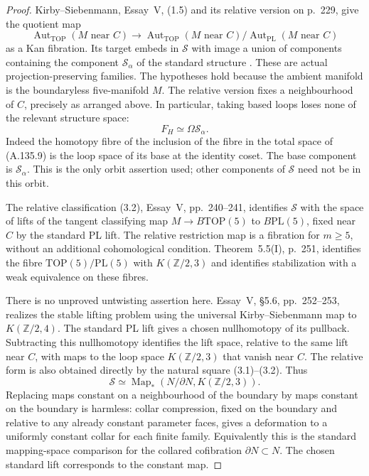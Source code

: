 \begin{proof}
Kirby--Siebenmann, Essay~V, (1.5) and its relative version on p.~229,
give the quotient map
\[
 \operatorname{Aut}_{\mathrm{TOP}}(M\text{ near }C)
 \longrightarrow
 \operatorname{Aut}_{\mathrm{TOP}}(M\text{ near }C)
 /\operatorname{Aut}_{\mathrm{PL}}(M\text{ near }C)
                                                        \tag{A.135.9}
\]
as a Kan fibration. Its target embeds in $\mathcal S$ with image a union
of components containing the component $\mathcal S_\alpha$ of the
standard structure \cite{KirbySiebenmann1977}. These are actual
projection-preserving families. The hypotheses hold because the
ambient manifold is the boundaryless five-manifold $M$. The relative
version fixes a neighbourhood of $C$, precisely as arranged above.
In particular, taking based loops loses none of the relevant structure
space:
\[
 F_H\simeq\Omega\mathcal S_\alpha.                       \tag{A.135.10}
\]
Indeed the homotopy fibre of the inclusion of the fibre in the total
space of (A.135.9) is the loop space of its base at the identity coset.
The base component is $\mathcal S_\alpha$. This is the only orbit
assertion used; other components of $\mathcal S$ need not be in this
orbit.

The relative classification (3.2), Essay~V, pp.~240--241, identifies
$\mathcal S$ with the space of lifts of the tangent classifying map
$M\to B\mathrm{TOP}(5)$ to $B\mathrm{PL}(5)$, fixed near $C$ by the
standard PL lift. The relative restriction map is a fibration for
$m\ge5$, without an additional cohomological condition. Theorem~5.5(I),
p.~251, identifies the fibre $\mathrm{TOP}(5)/\mathrm{PL}(5)$ with
$K(\mathbb Z/2,3)$ and identifies stabilization with a weak equivalence
on these fibres.

There is no unproved untwisting assertion here. Essay~V, \S5.6,
pp.~252--253, realizes the stable lifting problem using the universal
Kirby--Siebenmann map to $K(\mathbb Z/2,4)$. The standard PL lift gives
a chosen nullhomotopy of its pullback. Subtracting this nullhomotopy
identifies the lift space, relative to the same lift near $C$, with
maps to the loop space $K(\mathbb Z/2,3)$ that vanish near $C$.
The relative form is also obtained directly by the natural square
(3.1)--(3.2). Thus
\[
 \mathcal S\simeq
 \operatorname{Map}_*(N/\partial N,K(\mathbb Z/2,3)).      \tag{A.135.11}
\]
Replacing maps constant on a neighbourhood of the boundary by maps
constant on the boundary is harmless: collar compression, fixed on the
boundary and relative to any already constant parameter faces, gives
a deformation to a uniformly constant collar for each finite family.
Equivalently this is the standard mapping-space comparison for the
collared cofibration $\partial N\subset N$.
The chosen standard lift corresponds to the constant map.


\end{proof}
